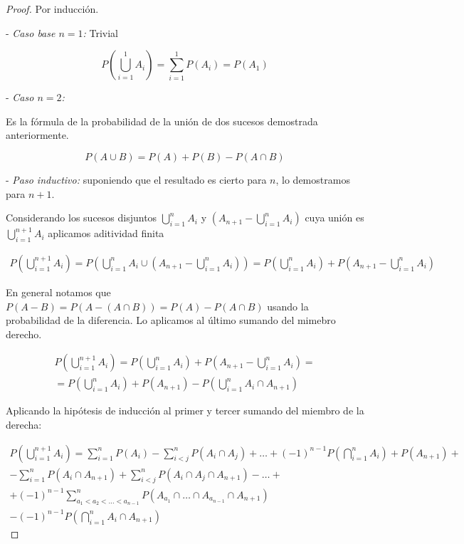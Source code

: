 \documentclass[
  a4paper,
  spanish,
  12pt,
]{scrartcl}
\begin{document}
\begin{proof}

Por inducción.

- \emph{Caso base $n=1$:} Trivial

$$
P\left(\bigcup_{i=1}^1 A_i \right) = \sum_{i=1}^1 P(A_i) = P(A_1)
$$

- \emph{Caso $n=2$:}

Es la fórmula de la probabilidad de la unión de dos sucesos demostrada anteriormente.

$$
P(A \cup B) = P(A) + P(B) - P(A \cap B)
$$

- \emph{Paso inductivo:} suponiendo que el resultado es cierto para $n$, lo demostramos para $n+1$.

Considerando los sucesos disjuntos $\bigcup_{i=1}^n A_i$ y $(A_{n+1} - \bigcup_{i=1}^n A_i)$ cuya unión es $\bigcup_{i=1}^{n+1} A_i$ aplicamos aditividad finita

\begin{equation*}
\begin{aligned}
P\left(\bigcup_{i=1}^{n+1} A_i \right) = P\left(\bigcup_{i=1}^n A_i \cup \left(A_{n+1} - \bigcup_{i=1}^n A_i\right) \right) = 
P\left(\bigcup_{i=1}^n A_i \right) + P\left(A_{n+1} - \bigcup_{i=1}^n A_i \right)
\end{aligned}
\end{equation*}

En general notamos que $P(A-B) = P(A - (A \cap B)) = P(A) - P(A\cap B)$ usando la probabilidad de la diferencia. Lo aplicamos al último sumando del mimebro derecho.

\begin{equation*}
\begin{aligned}
P\left(\bigcup_{i=1}^{n+1} A_i \right) = 
P\left(\bigcup_{i=1}^n A_i \right) + P\left(A_{n+1} - \bigcup_{i=1}^n A_i \right) = \\
=  P\left(\bigcup_{i=1}^n A_i \right) + P\left(A_{n+1} \right) - P\left(\bigcup_{i=1}^n A_i \cap A_{n+1} \right)
\end{aligned}
\end{equation*}

Aplicando la hipótesis de inducción al primer y tercer sumando del miembro de la derecha:

\begin{equation*}
\begin{aligned}
P\left(\bigcup_{i=1}^{n+1} A_i \right) = 
\sum_{i=1}^n P(A_i) - \sum_{i < j}^n P(A_i \cap A_j) + \dots  + (-1)^{n-1} P\left(\bigcap_{i=1}^n A_i \right) + P(A_{n+1}) +\\ 
- \sum_{i=1}^n P(A_i \cap A_{n+1}) + \sum_{i < j}^n P(A_i \cap A_j \cap A_{n+1}) - \dots  + \\
+ (-1)^{n-1}\sum_{a_1 < a_2 < ... < a_{n - 1}}^n P\left(A_{a_1} \cap \dots \cap  A_{a_{n-1}} \cap A_{n+1}\right)
\\ - (-1)^{n-1} P\left(\bigcap_{i=1}^n A_i \cap A_{n+1} \right) 
\end{aligned}
\end{equation*}


\end{proof}
\end{document}
